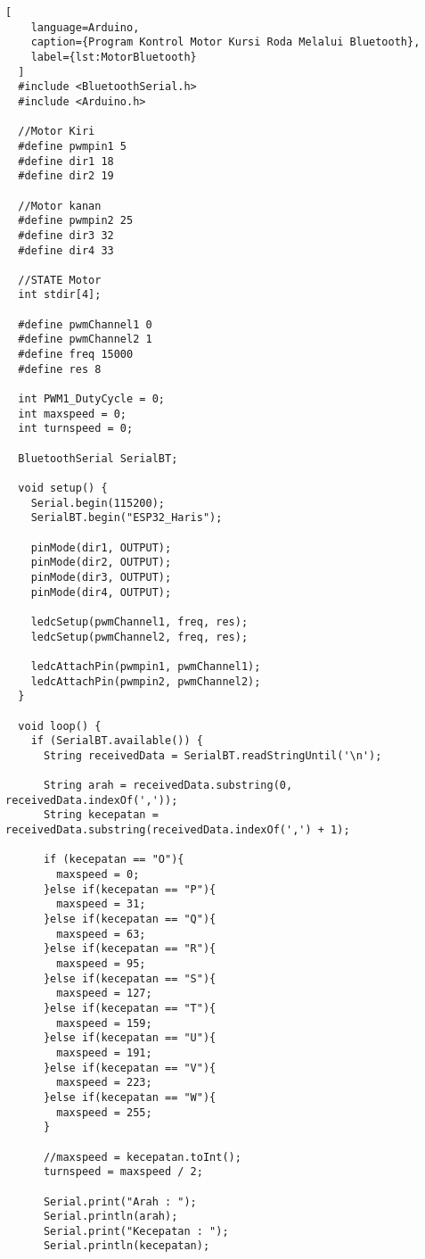 \begin{lstlisting}[
    language=Arduino,
    caption={Program Kontrol Motor Kursi Roda Melalui Bluetooth},
    label={lst:MotorBluetooth}
  ]
  #include <BluetoothSerial.h>
  #include <Arduino.h>
  
  //Motor Kiri
  #define pwmpin1 5
  #define dir1 18
  #define dir2 19
  
  //Motor kanan
  #define pwmpin2 25
  #define dir3 32
  #define dir4 33
  
  //STATE Motor
  int stdir[4];
  
  #define pwmChannel1 0
  #define pwmChannel2 1
  #define freq 15000
  #define res 8
  
  int PWM1_DutyCycle = 0;
  int maxspeed = 0;
  int turnspeed = 0;
  
  BluetoothSerial SerialBT;
  
  void setup() {
    Serial.begin(115200);
    SerialBT.begin("ESP32_Haris");
  
    pinMode(dir1, OUTPUT);
    pinMode(dir2, OUTPUT);
    pinMode(dir3, OUTPUT);
    pinMode(dir4, OUTPUT);
  
    ledcSetup(pwmChannel1, freq, res);
    ledcSetup(pwmChannel2, freq, res);
  
    ledcAttachPin(pwmpin1, pwmChannel1);
    ledcAttachPin(pwmpin2, pwmChannel2);
  }
  
  void loop() {
    if (SerialBT.available()) {
      String receivedData = SerialBT.readStringUntil('\n');
  
      String arah = receivedData.substring(0, receivedData.indexOf(','));
      String kecepatan = receivedData.substring(receivedData.indexOf(',') + 1);

      if (kecepatan == "O"){
        maxspeed = 0;
      }else if(kecepatan == "P"){
        maxspeed = 31;
      }else if(kecepatan == "Q"){
        maxspeed = 63;
      }else if(kecepatan == "R"){
        maxspeed = 95;
      }else if(kecepatan == "S"){
        maxspeed = 127;
      }else if(kecepatan == "T"){
        maxspeed = 159;
      }else if(kecepatan == "U"){
        maxspeed = 191;
      }else if(kecepatan == "V"){
        maxspeed = 223;
      }else if(kecepatan == "W"){
        maxspeed = 255;
      }
  
      //maxspeed = kecepatan.toInt();
      turnspeed = maxspeed / 2;
  
      Serial.print("Arah : ");
      Serial.println(arah);
      Serial.print("Kecepatan : ");
      Serial.println(kecepatan);
  

\end{lstlisting}
